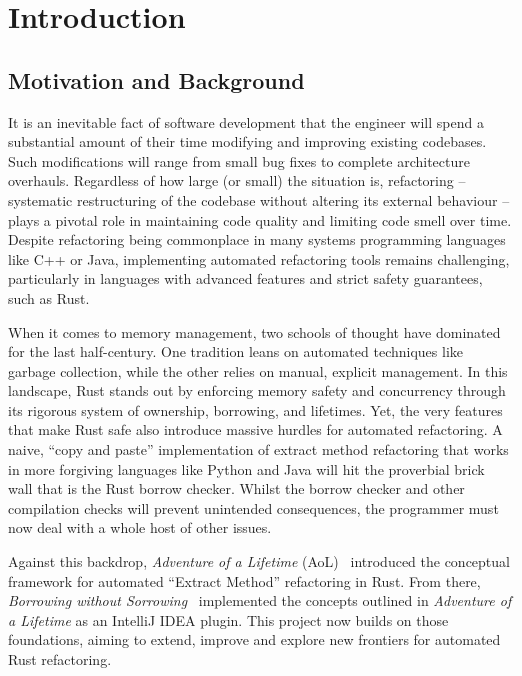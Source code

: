 \setcounter{chapter}{-1} %
\chapter{Introduction}
\label{chap:introduction}

\section{Motivation and Background}
\label{sec:motivation}

It is an inevitable fact of software development that the engineer will spend a
substantial amount of their time modifying and improving existing codebases.
Such modifications will range from small bug fixes to complete architecture
overhauls. Regardless of how large (or small) the situation is, refactoring –
systematic restructuring of the codebase without altering its external behaviour
– plays a pivotal role in maintaining code quality and limiting code smell over
time. Despite refactoring being commonplace in many systems programming
languages like C++ or Java, implementing automated refactoring tools remains
challenging, particularly in languages with advanced features and strict safety
guarantees, such as Rust.

When it comes to memory management, two schools of thought have dominated for
the last half-century. One tradition leans on automated techniques like garbage
collection, while the other relies on manual, explicit management. In this
landscape, Rust stands out by enforcing memory safety and concurrency through
its rigorous system of ownership, borrowing, and lifetimes. Yet, the very
features that make Rust safe also introduce massive hurdles for automated
refactoring. A naive, “copy and paste” implementation of extract method
refactoring that works in more forgiving languages like Python and Java will hit
the proverbial brick wall that is the Rust borrow checker. Whilst the borrow
checker and other compilation checks will prevent unintended consequences, the
programmer must now deal with a whole host of other issues.

Against this backdrop, \textit{Adventure of a Lifetime} (AoL)~\cite{aol}
introduced the conceptual framework for automated “Extract Method” refactoring
in Rust. From there, \textit{Borrowing without Sorrowing}~\cite{borrowing}
implemented the concepts outlined in \textit{Adventure of a Lifetime} as an
IntelliJ IDEA plugin. This project now builds on those foundations, aiming to
extend, improve and explore new frontiers for automated Rust refactoring.

